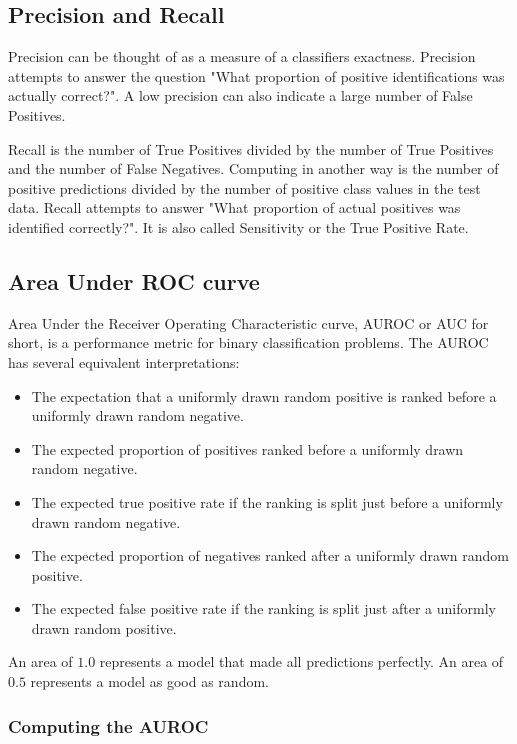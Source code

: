 \subsection{Precision and Recall}

Precision can be thought of as a measure of a classifiers exactness. Precision attempts to answer the question "What proportion of positive identifications was actually correct?". A low precision can also indicate a large number of False Positives.

Recall is the number of True Positives divided by the number of True Positives and the number of False Negatives. Computing in another way is the number of positive predictions divided by the number of positive class values in the test data. Recall attempts to answer "What proportion of actual positives was identified correctly?". It is also called Sensitivity or the True Positive Rate.

\subsection{Area Under ROC curve}
\label{ssec:auroc}

Area Under the Receiver Operating Characteristic curve, AUROC or AUC for short, is a performance metric for binary classification problems. The AUROC has several equivalent interpretations:

\begin{itemize}
\item The expectation that a uniformly drawn random positive is ranked before a uniformly drawn random negative.
\item The expected proportion of positives ranked before a uniformly drawn random negative.
\item The expected true positive rate if the ranking is split just before a uniformly drawn random negative.
\item  The expected proportion of negatives ranked after a uniformly drawn random positive.
\item  The expected false positive rate if the ranking is split just after a uniformly drawn random positive.
\end{itemize}

An area of $1.0$ represents a model that made all predictions perfectly. An area of $0.5$ represents a model as good as random.

\subsubsection{Computing the AUROC}

